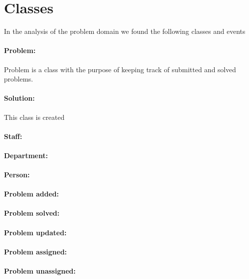 \section{Classes}

In the analysis of the problem domain we found the following classes and events\newline


\paragraph{Problem:}
Problem is a class with the purpose of keeping track of submitted and solved problems.

\paragraph{Solution:}
This class is created 

\paragraph{Staff:}

\paragraph{Department:}

\paragraph{Person:}

\paragraph{Problem added:}

\paragraph{Problem solved:}

\paragraph{Problem updated:}

\paragraph{Problem assigned:}

\paragraph{Problem unassigned:}

